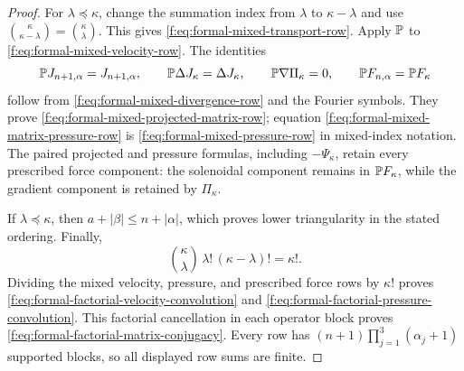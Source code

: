 \begin{proof}
For \(\lambda\preceq\kappa\), change the summation index from \(\lambda\)
to \(\kappa-\lambda\) and use
\(\binom\kappa{\kappa-\lambda}=\binom\kappa\lambda\).  This gives
\eqref{f:eq:formal-mixed-transport-row}.  Apply \(\mathbb P\) to
\eqref{f:eq:formal-mixed-velocity-row}.  The identities
\[
 \mathbb P J_{n+1,\alpha}=J_{n+1,\alpha},
 \qquad
 \mathbb P\Delta J_\kappa=\Delta J_\kappa,
 \qquad
 \mathbb P\nabla\Pi_\kappa=0,
 \qquad
 \mathbb P F_{n,\alpha}=\mathbb P F_\kappa
\]
follow from \eqref{f:eq:formal-mixed-divergence-row} and the Fourier symbols.
They prove \eqref{f:eq:formal-mixed-projected-matrix-row}; equation
\eqref{f:eq:formal-mixed-matrix-pressure-row} is
\eqref{f:eq:formal-mixed-pressure-row} in mixed-index notation.  The paired
projected and pressure formulas, including \(-\Psi_\kappa\), retain every
prescribed force component: the solenoidal component remains in
\(\mathbb P F_\kappa\), while the gradient component is retained by
\(\Pi_\kappa\).

If \(\lambda\preceq\kappa\), then
\(a+|\beta|\le n+|\alpha|\), which proves lower triangularity in the stated
ordering.  Finally,
\[
 \binom\kappa\lambda\,\lambda!\,(\kappa-\lambda)!=\kappa!.
\]
Dividing the mixed velocity, pressure, and prescribed force rows by
\(\kappa!\) proves
\eqref{f:eq:formal-factorial-velocity-convolution} and
\eqref{f:eq:formal-factorial-pressure-convolution}.  This factorial cancellation in each operator block proves
\eqref{f:eq:formal-factorial-matrix-conjugacy}.  Every row has
\((n+1)\prod_{j=1}^3(\alpha_j+1)\) supported blocks, so all displayed row
sums are finite.
\end{proof}

